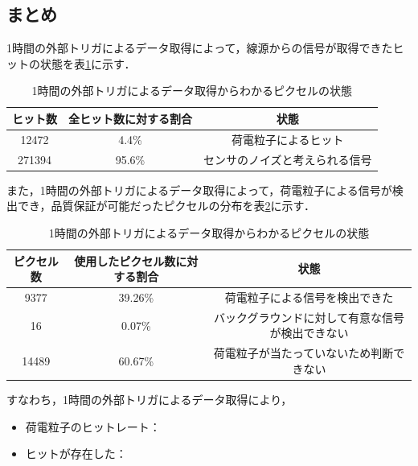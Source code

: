 \subsection*{まとめ}
1時間の外部トリガによるデータ取得によって，線源からの信号が取得できたヒットの状態を表\ref{tab:exthit}に示す．

\begin{table}[h]
  \centering
  \caption{1時間の外部トリガによるデータ取得からわかるピクセルの状態}
  \label{tab:exthit}
  \begin{tabular}{ccc} \hline
    ヒット数 & 全ヒット数に対する割合 & 状態 \\ \hline
    12472 & 4.4\% & 荷電粒子によるヒット\\
    271394 & 95.6\% & センサのノイズと考えられる信号\\ \hline
  \end{tabular}
\end{table}

また，1時間の外部トリガによるデータ取得によって，荷電粒子による信号が検出でき，品質保証が可能だったピクセルの分布を表\ref{tab:extconc}に示す．

\begin{table}[h]
  \centering
  \caption{1時間の外部トリガによるデータ取得からわかるピクセルの状態}
  \label{tab:extconc}
  \begin{tabular}{ccc} \hline
    ピクセル数 & 使用したピクセル数に対する割合 & 状態\\ \hline
    9377 & 39.26\% & 荷電粒子による信号を検出できた \\
    16 & 0.07\% & バックグラウンドに対して有意な信号が検出できない \\
    14489 & 60.67\% & 荷電粒子が当たっていないため判断できない \\ \hline
  \end{tabular}
\end{table}

すなわち，1時間の外部トリガによるデータ取得により，
\begin{itemize}
\item 荷電粒子のヒットレート：
\item ヒットが存在した：
\end{itemize}

  
  




